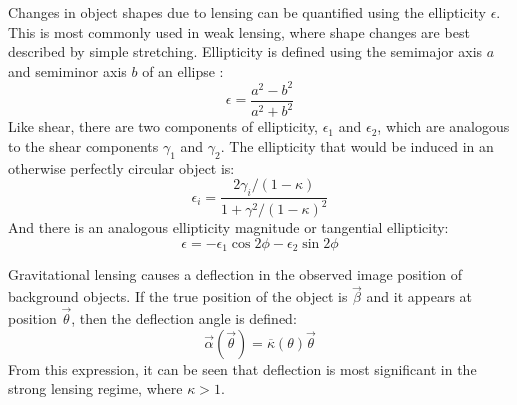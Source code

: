 \documentclass[10pt]{article}
\begin{document}
Changes in object shapes due to lensing can be quantified using the ellipticity $\epsilon$. This is most commonly used in weak lensing, where shape changes are best described by simple stretching. Ellipticity is defined using the semimajor axis $a$ and semiminor axis $b$ of an ellipse \citep{Narayan1996}:
\begin{equation}
\epsilon = \frac{a^2 - b^2}{a^2 + b^2}
\end{equation}
Like shear, there are two components of ellipticity, $\epsilon_1$ and $\epsilon_2$, which are analogous to the shear components $\gamma_1$ and $\gamma_2$. The ellipticity that would be induced in an otherwise perfectly circular object is:
\begin{equation} \label{ellipticity}
\epsilon_i = \frac{2 \gamma_i/(1 - \kappa)}{1 + \gamma^2/(1 - \kappa)^2}
\end{equation}
And there is an analogous ellipticity magnitude or tangential ellipticity:
\begin{equation}
\epsilon =  -\epsilon_1 \cos{2\phi} -\epsilon_2 \sin{2\phi}
\end{equation}

Gravitational lensing causes a deflection in the observed image position of background objects. If the true position of the object is $\vec{\beta}$ and it appears at position $\vec{\theta}$, then the deflection angle is defined:
\begin{equation}
\vec{\alpha}(\vec{\theta}) = \overline{\kappa}(\theta)\vec{\theta}
\end{equation}
From this expression, it can be seen that deflection is most significant in the strong lensing regime, where $\kappa > 1$.
\end{document}
